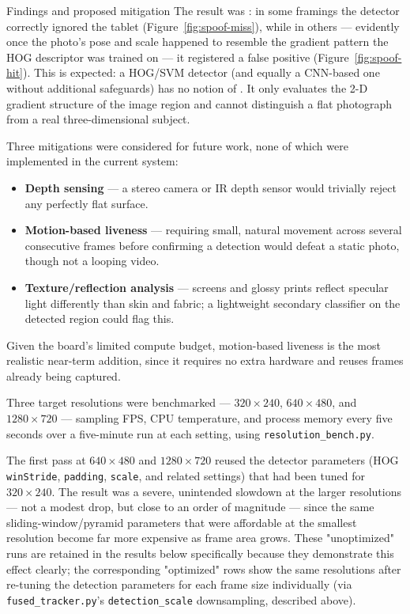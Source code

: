 \begin{answersection}{Findings and proposed mitigation}
The result was : in
some framings the detector correctly ignored the tablet
(Figure~\ref{fig:spoof-miss}), while in others — evidently once the
photo's pose and scale happened to resemble the gradient pattern the HOG
descriptor was trained on — it registered a false positive
(Figure~\ref{fig:spoof-hit}). This is expected: a HOG/SVM detector (and
equally a CNN-based one without additional safeguards) has no notion of
. It only evaluates the 2-D gradient structure of the
image region and cannot distinguish a flat photograph from a real
three-dimensional subject.

Three mitigations were considered for future work, none of which were
implemented in the current system:
\begin{itemize}
    \item \textbf{Depth sensing} — a stereo camera or IR depth sensor
    would trivially reject any perfectly flat surface.
    \item \textbf{Motion-based liveness} — requiring small, natural
    movement across several consecutive frames before confirming a
    detection would defeat a static photo, though not a looping video.
    \item \textbf{Texture/reflection analysis} — screens and glossy
    prints reflect specular light differently than skin and fabric; a
    lightweight secondary classifier on the detected region could flag
    this.
\end{itemize}
Given the board's limited compute budget, motion-based liveness is the
most realistic near-term addition, since it requires no extra hardware and
reuses frames already being captured.
\end{answersection}

\label{sec:resolution-experiment}

Three target resolutions were benchmarked — $320\times240$, $640\times480$,
and $1280\times720$ — sampling FPS, CPU temperature, and process memory
every five seconds over a five-minute run at each setting, using
\texttt{resolution\_bench.py}.


The first pass at $640\times480$ and $1280\times720$ reused the detector
parameters (HOG \texttt{winStride}, \texttt{padding}, \texttt{scale}, and
related settings) that had been tuned for $320\times240$. The result was a
severe, unintended slowdown at the larger resolutions — not a modest
drop, but close to an order of magnitude — since the same
sliding-window/pyramid parameters that were affordable at the smallest
resolution become far more expensive as frame area grows. These
"unoptimized" runs are retained in the results below specifically because
they demonstrate this effect clearly; the corresponding "optimized" rows
show the same resolutions after re-tuning the detection parameters for
each frame size individually (via \texttt{fused\_tracker.py}'s
\texttt{detection\_scale} downsampling, described above).

